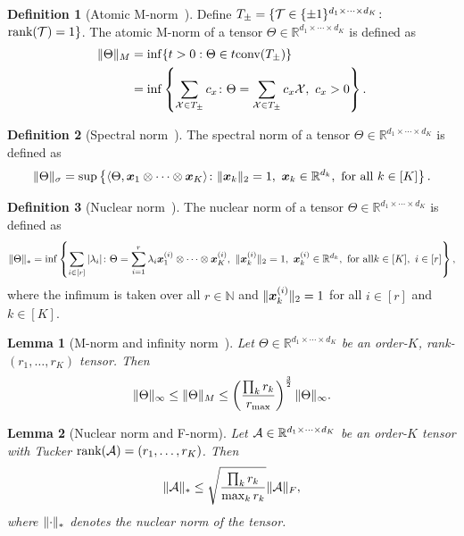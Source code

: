 \documentclass{article}
\theoremstyle{plain}
\newtheorem{lem}{Lemma}
\theoremstyle{definition}
\newtheorem{defn}{Definition}
\begin{document}
\begin{defn}[Atomic M-norm~\citep{ghadermarzy2019near}]
Define $T_{\pm}=\{\mathcal{T}\in\{\pm 1 \}^{d_1\times \cdots \times d_K}\colon$ $\text{rank}(\mathcal{T})=1\}$. The atomic M-norm of a tensor $\Theta\in\mathbb{R}^{d_1\times \cdots \times d_K}$ is defined as
\begin{align}
\lVert\Theta\rVert_M&=\inf\{t>0: \Theta\in t\text{conv}(T_{\pm})\}\\
&=\inf\left\{\sum_{\mathcal{X}\in T_{\pm}}c_x\colon \Theta=\sum_{\mathcal{X}\in T_{\pm}} c_x\mathcal{X}, \ c_x>0\right\}.
\end{align}
\end{defn}

\begin{defn}[Spectral norm~\citep{lim2005singular}]
The spectral norm of a tensor $\Theta\in\mathbb{R}^{d_1\times \cdots \times d_K}$ is defined as
\[
\snormSize{}{\Theta}=\sup\left\{\langle \Theta, \mx_1\otimes \cdots \otimes \mx_K\rangle \colon \vnormSize{}{\mx_k}=1,\ \mx_k\in\mathbb{R}^{d_k},\ \text{for all}\ k\in[K]\right\}.
\]
\end{defn}

\begin{defn}[Nuclear norm~\citep{friedland2018nuclear}]
The nuclear norm of a tensor $\Theta\in\mathbb{R}^{d_1\times \cdots \times d_K}$ is defined as
\[
\nnormSize{}{\Theta}=\inf
\left\{
\sum_{i\in[r]}|\lambda_i|\colon \Theta=\sum_{i=1}^r \lambda_i\mx^{(i)}_1\otimes \cdots \otimes \mx^{(i)}_K,\ \vnormSize{}{\mx^{(i)}_k}=1,\ \mx^{(i)}_k\in\mathbb{R}^{d_k},\ \text{for all} k\in[K],\ i\in[r]
\right\},
\]
where the infimum is taken over all $r\in\mathbb{N}$ and $\lVert\bm x^{(i)}_k\rVert_2=1$ for all $i\in[r]$ and $k\in[K]$.
\end{defn}



\begin{lem}[M-norm and infinity norm~\citep{ghadermarzy2019near}]\label{lem:Mnormbound}
Let $\Theta\in\mathbb{R}^{d_1\times \cdots \times d_K}$ be an order-$K$, rank-$(r_1,\ldots,r_K)$ tensor. Then
\[
\lVert\Theta\rVert_\infty\leq \lVert\Theta\rVert_M\leq \left(\prod_k r_k \over r_{\max}\right)^{3\over 2} \lVert\Theta\rVert_\infty.
\]
\end{lem}


\begin{lem}[Nuclear norm and F-norm] \label{lem:nuclear}
Let $\mathcal{A}\in\mathbb{R}^{d_1\times\cdots\times d_K}$ be an order-$K$ tensor with Tucker $\text{rank}(\mathcal{A})=(r_1,\ldots,r_K)$. Then
\[
\lVert\mathcal{A}\rVert_* \leq \sqrt{\prod_k r_k\over \max_k r_k} \lVert\mathcal{A}\rVert_F,
\]
where $\lVert\cdot\rVert_*$ denotes the nuclear norm of the tensor.
\end{lem}
\end{document}
